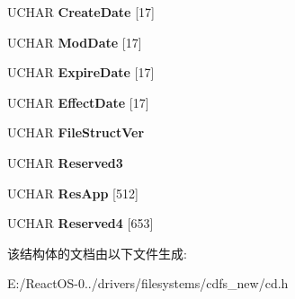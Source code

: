 \begin{DoxyCompactItemize}
U\+C\+H\+AR {\bfseries Create\+Date} \mbox{[}17\mbox{]}
\item 
\mbox{\label{struct___r_a_w___i_s_o___v_d_a547940d39412c47e5c961fc52891fd41}} 
U\+C\+H\+AR {\bfseries Mod\+Date} \mbox{[}17\mbox{]}
\item 
\mbox{\label{struct___r_a_w___i_s_o___v_d_a9765c1d52aea1f560c5970c5d0097372}} 
U\+C\+H\+AR {\bfseries Expire\+Date} \mbox{[}17\mbox{]}
\item 
\mbox{\label{struct___r_a_w___i_s_o___v_d_a06a9341a87fc1a716a133df5b084f57d}} 
U\+C\+H\+AR {\bfseries Effect\+Date} \mbox{[}17\mbox{]}
\item 
\mbox{\label{struct___r_a_w___i_s_o___v_d_ac0a79c1a1bcb17d81d5d4e4b5a5b1760}} 
U\+C\+H\+AR {\bfseries File\+Struct\+Ver}
\item 
\mbox{\label{struct___r_a_w___i_s_o___v_d_a37b933dc0e4fe5dcb8a23ce061fb5b05}} 
U\+C\+H\+AR {\bfseries Reserved3}
\item 
\mbox{\label{struct___r_a_w___i_s_o___v_d_a6067e60efe88196bac5cc6f7e7f731f5}} 
U\+C\+H\+AR {\bfseries Res\+App} \mbox{[}512\mbox{]}
\item 
\mbox{\label{struct___r_a_w___i_s_o___v_d_ab9286e9889f67737983d89d48bf9b7b7}} 
U\+C\+H\+AR {\bfseries Reserved4} \mbox{[}653\mbox{]}
\end{DoxyCompactItemize}


该结构体的文档由以下文件生成\+:\begin{DoxyCompactItemize}
\item 
E\+:/\+React\+O\+S-\/0../drivers/filesystems/cdfs\+\_\+new/cd.\+h\end{DoxyCompactItemize}
